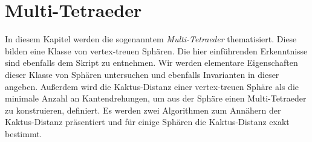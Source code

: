 \documentclass[12pt,titlepage,twoside,cleardoublepage]{article}
\theoremstyle{nummermitklammern}
\numberwithin{equation}{section}
\begin{document}
\section{Multi-Tetraeder}\label{kapitelmultitetraeder}
In diesem Kapitel werden die sogenanntem \emph{Multi-Tetraeder} thematisiert. Diese bilden eine Klasse von vertex-treuen Sphären. Die hier einführenden Erkenntnisse sind ebenfalls dem Skript \cite{simp} zu entnehmen. Wir werden elementare Eigenschaften dieser Klasse von Sphären untersuchen und ebenfalls Invarianten in dieser angeben. Außerdem wird die Kaktus-Distanz einer vertex-treuen Sphäre als die minimale Anzahl an Kantendrehungen, um aus der Sphäre einen Multi-Tetraeder zu konstruieren, definiert. Es werden zwei Algorithmen zum Annähern der Kaktus-Distanz präsentiert und für einige Sphären die Kaktus-Distanz exakt bestimmt.
\end{document}
